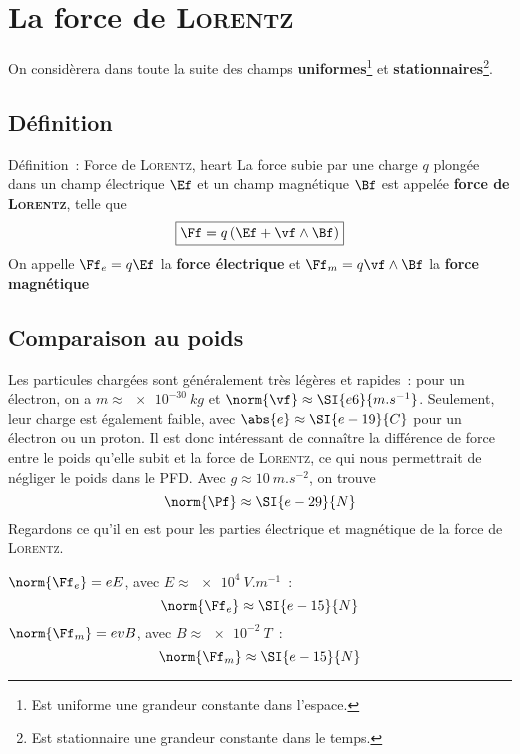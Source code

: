 \documentclass[../main/main.tex]{subfiles}
\begin{document}
\vspace{-12pt}
\section{La force de \textsc{Lorentz}}
On considèrera dans toute la suite des champs \textbf{uniformes}\footnote{Est
uniforme une grandeur constante dans l'espace.} et
\textbf{stationnaires}\footnote{Est stationnaire une grandeur constante dans le
temps.}.
\vspace{-12pt}

\subsection{Définition}
\begin{tdefi}{Définition~: Force de \textsc{Lorentz}, heart}
    La force subie par une charge $q$ plongée dans un champ électrique $\Ef$ et
    un champ magnétique $\Bf$ est appelée \textbf{force de \textsc{Lorentz}},
    telle que
    \[\boxed{\Ff = q\left(\Ef + \vf \wedge \Bf\right)}\]
    On appelle $\Ff_e = q\Ef$ la \textbf{force électrique} et $\Ff_m =
    q\vf\wedge\Bf$ la \textbf{force magnétique}
\end{tdefi}

\subsection{Comparaison au poids}

Les particules chargées sont généralement très légères et rapides~: pour un
électron, on a $m \approx \SI{e-30}{kg}$ et $\norm{\vf} \approx
\SI{e6}{m.s^{-1}}$. Seulement, leur charge est également faible, avec $\abs{e}
\approx \SI{e-19}{C}$ pour un électron ou un proton. Il est donc intéressant de
connaître la différence de force entre le poids qu'elle subit et la force de
\textsc{Lorentz}, ce qui nous permettrait de négliger le poids dans le PFD.
Avec $g \approx \SI{10}{m.s^{-2}}$, on trouve
\[\norm{\Pf} \approx \SI{e-29}{N}\]
Regardons ce qu'il en est pour les parties électrique et magnétique de la force
de \textsc{Lorentz}.
\bigbreak

\begin{itemize}[label=$\diamond$]
     $\norm{\Ff_e} = eE$, avec $E \approx
        \SI{e4}{V.m^{-1}}$~:
        \[\norm{\Ff_e} \approx \SI{e-15}{N}\]
     $\norm{\Ff_m} = evB$, avec $B \approx
        \SI{e-2}{T}$~:
        \[\norm{\Ff_m} \approx \SI{e-15}{N}\]
\end{itemize}
\end{document}
